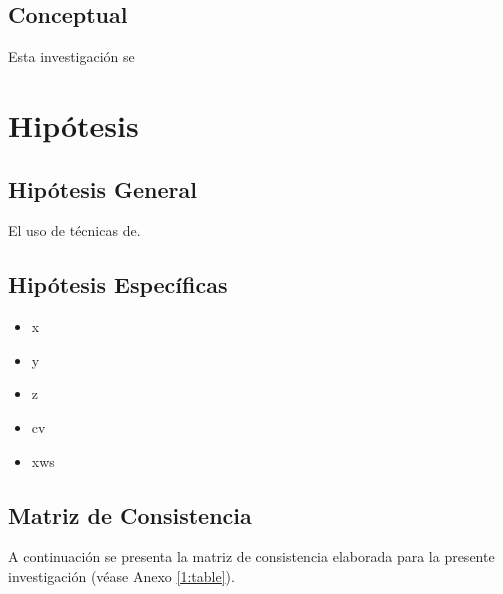 \subsection{Conceptual}
Esta investigación se 

\section{Hipótesis}

\subsection{Hipótesis General}
\newcommand{\HipotesisGeneral}{
El uso de técnicas de.
}
\HipotesisGeneral
\subsection{Hipótesis Específicas}
\newcommand{\Hone}{
	x
}
\newcommand{\Htwo}{
	y
}
\newcommand{\Hthree}{
	z	
}
\newcommand{\Hfour}{
	cv
}
\newcommand{\Hfive}{
	xws
}
\begin{itemize}
	\item \Hone
	\item \Htwo
	\item \Hthree
	\item \Hfour
	\item \Hfive
\end{itemize}

\subsection{Matriz de Consistencia}
A continuación se presenta la matriz de consistencia elaborada para la presente investigación (véase Anexo \ref{1:table}).

